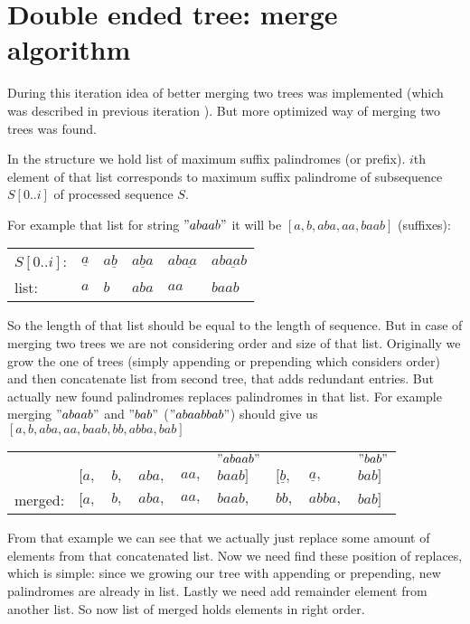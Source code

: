\section{Double ended tree: merge algorithm}
During this iteration idea of better merging two trees was implemented (which was described in previous iteration \cite{khazhix4}). But more optimized way of merging two trees was found. 

In the structure we hold list of maximum suffix palindromes (or prefix). $i$th element of that list corresponds to maximum suffix palindrome of subsequence $S[0..i]$ of processed sequence $S$. 

For example that list for string $"abaab"$ it will be $[a, b, aba, aa, baab]$ (suffixes):
\begin{table}[H]
\begin{tabular}{llllll}
$S[0..i]$: & $\underline{a}$ & $a \underline{b}$ & $\underline{aba}$ & $ab \underline{aa}$ & $a \underline{baab}$ \\
list:   & $a$                 & $b$                  & $aba$               & $aa$                 & $baab$              
\end{tabular}
\end{table}
So the length of that list should be equal to the length of sequence. But in case of merging two trees we are not considering order and size of that list. Originally we grow the one of trees (simply appending or prepending which considers order) and then concatenate list from second tree, that adds redundant entries. But actually new found palindromes replaces palindromes in that list. 
For example merging $"abaab"$ and $"bab"$ ($"abaabbab"$) should give us $[a, b, aba, aa, baab, bb, abba, bab]$
\begin{table}[H]
\begin{tabular}{lllllllll}
        &  &      &        &       &         $"abaab"$&  &         &$"bab"$        \\
        & $[a,$    & $b,$ & $aba,$ & $aa,$ & $baab]$ & $[\underline{b},$   & $\underline{a},$    & $bab]$ \\
merged: & $[a,$     & $b,$ & $aba,$ & $aa,$ & $baab,$ & \underline{$bb,$}   & \underline{$abba,$} & $bab]$
\end{tabular}
\end{table}
From that example we can see that we actually just replace some amount of elements from that concatenated list. Now we need find these position of replaces, which is simple: since we growing our tree with appending or prepending, new palindromes are already in list. Lastly we need add remainder element from another list. So now list of merged holds elements in right order. 

